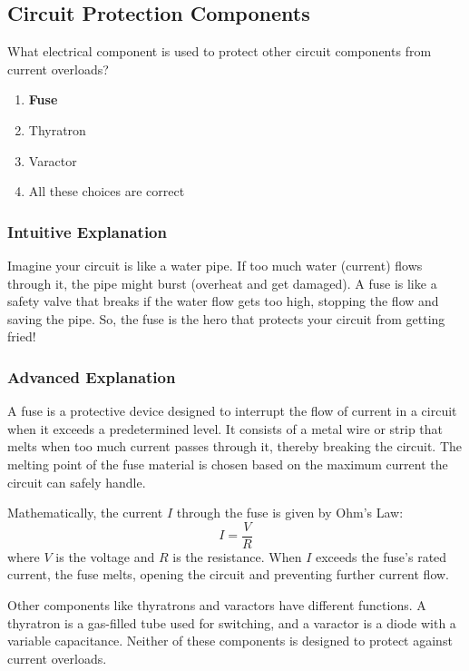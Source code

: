 \subsection{Circuit Protection Components}
\label{T6A09}

\begin{tcolorbox}[colback=gray!10!white,colframe=black!75!black,title=T6A09]
What electrical component is used to protect other circuit components from current overloads?
\begin{enumerate}[label=\Alph*)]
    \item \textbf{Fuse}
    \item Thyratron
    \item Varactor
    \item All these choices are correct
\end{enumerate}
\end{tcolorbox}

\subsubsection{Intuitive Explanation}
Imagine your circuit is like a water pipe. If too much water (current) flows through it, the pipe might burst (overheat and get damaged). A fuse is like a safety valve that breaks if the water flow gets too high, stopping the flow and saving the pipe. So, the fuse is the hero that protects your circuit from getting fried!

\subsubsection{Advanced Explanation}
A fuse is a protective device designed to interrupt the flow of current in a circuit when it exceeds a predetermined level. It consists of a metal wire or strip that melts when too much current passes through it, thereby breaking the circuit. The melting point of the fuse material is chosen based on the maximum current the circuit can safely handle. 

Mathematically, the current \( I \) through the fuse is given by Ohm's Law:
\[ I = \frac{V}{R} \]
where \( V \) is the voltage and \( R \) is the resistance. When \( I \) exceeds the fuse's rated current, the fuse melts, opening the circuit and preventing further current flow.

Other components like thyratrons and varactors have different functions. A thyratron is a gas-filled tube used for switching, and a varactor is a diode with a variable capacitance. Neither of these components is designed to protect against current overloads.

